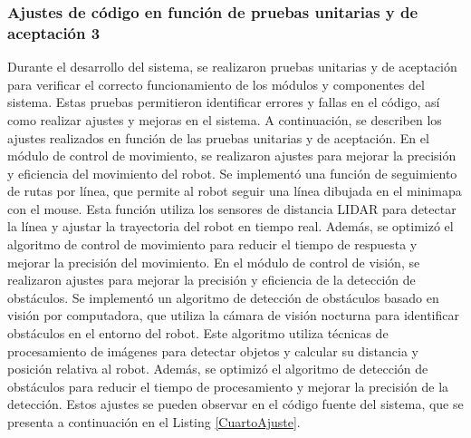 \subsubsection{Ajustes de c\'odigo en funci\'on de pruebas unitarias y de aceptaci\'on 3} %
\label{sub:Ajustes de c\'odigo en funci\'on de pruebas unitarias y de aceptaci\'on}
    Durante el desarrollo del sistema, se realizaron pruebas unitarias y de aceptaci\'on para verificar el correcto funcionamiento 
        de los m\'odulos y componentes del sistema. Estas pruebas permitieron identificar errores y fallas en el c\'odigo, 
        as\'i como realizar ajustes y mejoras en el sistema. A continuaci\'on, se describen los ajustes realizados en funci\'on 
        de las pruebas unitarias y de aceptaci\'on.
    \vskip 0.5cm
    En el m\'odulo de control de movimiento, se realizaron ajustes para mejorar la precisi\'on y eficiencia del movimiento del robot. 
        Se implement\'o una funci\'on de seguimiento de rutas por l\'inea, que permite al robot seguir una l\'inea dibujada en el 
        minimapa con el mouse. Esta funci\'on utiliza los sensores de distancia LIDAR para detectar la l\'inea y ajustar la 
        trayectoria del robot en tiempo real. Adem\'as, se optimiz\'o el algoritmo de control de movimiento para reducir 
        el tiempo de respuesta y mejorar la precisi\'on del movimiento.
    \vskip 0.5cm
    En el m\'odulo de control de visi\'on, se realizaron ajustes para mejorar la precisi\'on y eficiencia de la detecci\'on de obst\'aculos. 
        Se implement\'o un algoritmo de detecci\'on de obst\'aculos basado en visi\'on por computadora, que utiliza la c\'amara de 
        visi\'on nocturna para identificar obst\'aculos en el entorno del robot. Este algoritmo utiliza t\'ecnicas de procesamiento 
        de im\'agenes para detectar objetos y calcular su distancia y posici\'on relativa al robot. Adem\'as, se optimiz\'o el 
        algoritmo de detecci\'on de obst\'aculos para reducir el tiempo de procesamiento y mejorar la precisi\'on de la detecci\'on.
    \vskip 0.5cm
    Estos ajustes se pueden observar en el c\'odigo fuente del sistema, que se presenta a continuaci\'on en el Listing \ref{CuartoAjuste}.
